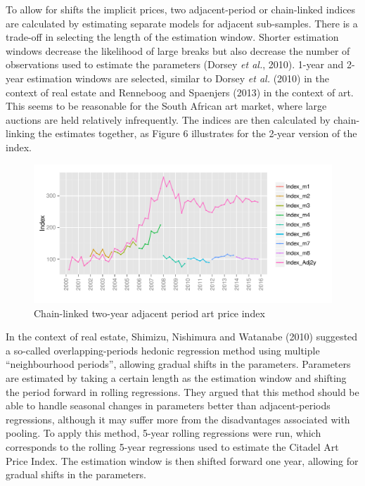 \documentclass[12pt,]{article}
\begin{document}
To allow for shifts the implicit prices, two adjacent-period or
chain-linked indices are calculated by estimating separate models for
adjacent sub-samples. There is a trade-off in selecting the length of
the estimation window. Shorter estimation windows decrease the
likelihood of large breaks but also decrease the number of observations
used to estimate the parameters (Dorsey \emph{et al.}, 2010). 1-year and
2-year estimation windows are selected, similar to Dorsey \emph{et al.}
(2010) in the context of real estate and Renneboog and Spaenjers (2013)
in the context of art. This seems to be reasonable for the South African
art market, where large auctions are held relatively infrequently. The
indices are then calculated by chain-linking the estimates together, as
Figure 6 illustrates for the 2-year version of the index.

\begin{figure}[htbp]
\centering
\includegraphics{Art_Price_Indices_3_files/figure-latex/figure6-1.pdf}
\caption{Chain-linked two-year adjacent period art price index}
\end{figure}

In the context of real estate, Shimizu, Nishimura and Watanabe (2010)
suggested a so-called overlapping-periods hedonic regression method
using multiple ``neighbourhood periods'', allowing gradual shifts in the
parameters. Parameters are estimated by taking a certain length as the
estimation window and shifting the period forward in rolling
regressions. They argued that this method should be able to handle
seasonal changes in parameters better than adjacent-periods regressions,
although it may suffer more from the disadvantages associated with
pooling. To apply this method, 5-year rolling regressions were run,
which corresponds to the rolling 5-year regressions used to estimate the
Citadel Art Price Index. The estimation window is then shifted forward
one year, allowing for gradual shifts in the parameters.
\end{document}
